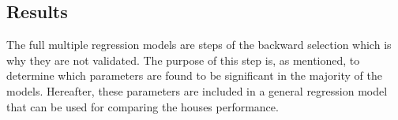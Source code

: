 

\subsection{Results}
The full multiple regression models are steps of the backward selection which is why they are not validated. The purpose of this step is, as mentioned, to determine which parameters are found to be significant in the majority of the models. Hereafter, these parameters are included in a general regression model that can be used for comparing the houses performance. \\

